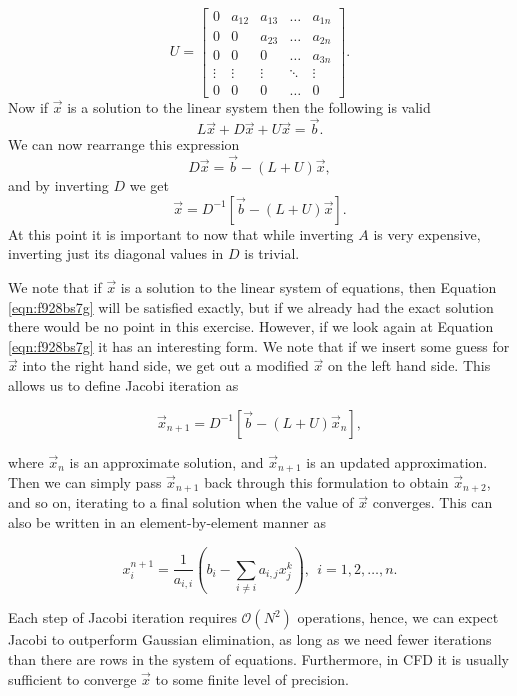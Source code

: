 \begin{equation}
	U = 
	\begin{bmatrix}
	    0 & a_{12} & a_{13} & \dots  & a_{1n} \\
	    0 & 0 & a_{23} & \dots  & a_{2n} \\
			0 & 0 & 0 & \dots  & a_{3n} \\
	    \vdots & \vdots & \vdots & \ddots & \vdots \\
	    0 & 0 & 0 & \dots  & 0
	\end{bmatrix}.
\end{equation}
Now if $\vec{x}$ is a solution to the linear system then the following is valid
\begin{equation}
	L\vec{x} + D\vec{x} + U\vec{x} = \vec{b}.
\end{equation}
We can now rearrange this expression
\begin{equation}
	D\vec{x} = \vec{b} - (L+U)\vec{x},
\end{equation}
and by inverting $D$ we get
\begin{equation}
	\vec{x} = D^{-1}\left[ \vec{b} - (L+U)\vec{x} \right].
	\label{eqn:f928bs7g}
\end{equation}
At this point it is important to now that while inverting $A$ is very expensive, inverting just its diagonal values in $D$ is trivial.

We note that if $\vec{x}$ is a solution to the linear system of equations, then Equation \ref{eqn:f928bs7g} will be satisfied exactly, but if we already had the exact solution there would be no point in this exercise. However, if we look again at Equation \ref{eqn:f928bs7g} it has an interesting form. We note that if we insert some guess for $\vec{x}$ into the right hand side, we get out a modified $\vec{x}$ on the left hand side. This allows us to define Jacobi iteration as
\begin{eqBox}
\begin{equation}
	\vec{x}_{n+1} = D^{-1}\left[ \vec{b} - (L+U)\vec{x}_n \right],
	\label{eqn:3jc810fg}
\end{equation}
\end{eqBox}
where $\vec{x}_n$ is an approximate solution, and $\vec{x}_{n+1}$ is an updated approximation. Then we can simply pass $\vec{x}_{n+1}$ back through this formulation to obtain $\vec{x}_{n+2}$, and so on, iterating to a final solution when the value of $\vec{x}$ converges. This can also be written in an element-by-element manner as
\begin{eqBox}
\begin{equation}
	x_i^{n+1} = \frac{1}{a_{i,i}}\left(b_i - \sum_{i \neq i} a_{i,j}x_j^k \right), \: \: i = 1,2,\hdots,n.
\end{equation}
\end{eqBox}
Each step of Jacobi iteration requires $\mathcal{O}(N^2)$ operations, hence, we can expect Jacobi to outperform Gaussian elimination, as long as we need fewer iterations than there are rows in the system of equations. Furthermore, in CFD it is usually sufficient to converge $\vec{x}$ to some finite level of precision.

